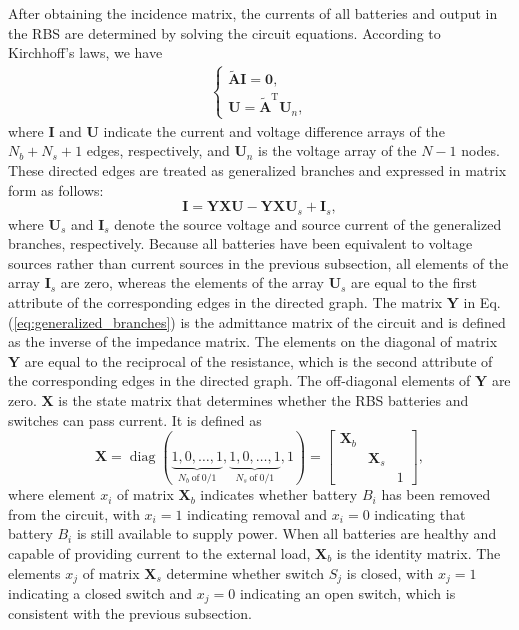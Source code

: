 \documentclass{article}
\DeclareMathOperator{\diag}{diag}
\def\T{\mathrm{T}}
\begin{document}
After obtaining the incidence matrix, the currents of all batteries and output in the RBS are determined by solving the circuit equations.
According to Kirchhoff's laws, we have
\begin{align}\label{eq:Kirchhoffs_law}
    \begin{cases}
        \bm{\tilde{A}} \bm{I} = \bm{0}, \\
        \bm{U}        = \bm{\tilde{A}}^\T \bm{U}_n,
    \end{cases}
\end{align}
where $\bm{I}$ and $\bm{U}$ indicate the current and voltage difference arrays of the $N_b+N_s+1$ edges, respectively, and
$\bm{U}_n$ is the voltage array of the $N-1$ nodes.
These directed edges are treated as generalized branches and expressed in matrix form as follows:
\begin{equation}\label{eq:generalized_branches}
    \bm{I} = \bm{Y}\bm{X} \bm{U} - \bm{Y}\bm{X} \bm{U}_s +\bm{I}_s,
\end{equation}
where $\bm{U}_s$ and $\bm{I}_s$ denote the source voltage and source current of the generalized branches, respectively.
Because all batteries have been equivalent to voltage sources rather than current sources in the previous subsection, all elements of the array $\bm{I}_s$ are zero, 
whereas the elements of the array $\bm{U}_s$ are equal to the first attribute of the corresponding edges in the directed graph.
The matrix $\bm{Y}$ in Eq. (\ref{eq:generalized_branches}) is the admittance matrix of the circuit and is defined as the inverse of the impedance matrix.
The elements on the diagonal of matrix $\bm{Y}$ are equal to the reciprocal of the resistance, which is the second attribute of the corresponding edges in the directed graph. The off-diagonal elements of $\bm{Y}$ are zero.
$\bm{X}$ is the state matrix that determines whether the RBS batteries and switches can pass current.
It is defined as
\begin{equation}\label{eq:X}
    \bm{X} = \diag(
    \underbrace{1, 0, \dots, 1}_{N_b~\text{of}~0/1},
    \underbrace{1, 0, \dots, 1}_{N_s~\text{of}~0/1},
    1)
    =\begin{bmatrix}
        \bm{X}_b & & \\
        & \bm{X}_s &\\
        & & 1
    \end{bmatrix},
\end{equation}
where element $x_i$ of matrix $\bm{X}_b$ indicates whether battery $B_i$ has been removed from the circuit, with $x_i=1$ indicating removal and $x_i=0$ indicating that battery $B_i$ is still available to supply power. 
When all batteries are healthy and capable of providing current to the external load, $\bm{X}_b$ is the identity matrix. 
The elements $x_j$ of  matrix $\bm{X}_s$ determine whether switch $S_j$ is closed, with $x_j=1$ indicating a closed switch and $x_j=0$ indicating an open switch, which is consistent with the previous subsection.
\end{document}
